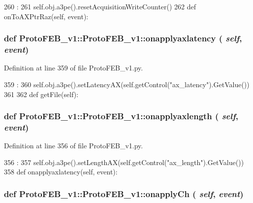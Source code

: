 \begin{DoxyCode}
260                                        :
261         self.obj.a3pe().resetAcquisitionWriteCounter()
262 
    def onToAXPtrRaz(self, event):
\end{DoxyCode}
\hypertarget{classProtoFEB__v1_1_1ProtoFEB__v1_ae3fb3c8b815e39c00a044325508913c8}{
\subsubsection[{onapplyaxlatency}]{\setlength{\rightskip}{0pt plus 5cm}def ProtoFEB\_\-v1::ProtoFEB\_\-v1::onapplyaxlatency ( {\em self}, \/   {\em event})}}
\label{classProtoFEB__v1_1_1ProtoFEB__v1_ae3fb3c8b815e39c00a044325508913c8}


Definition at line 359 of file ProtoFEB\_\-v1.py.


\begin{DoxyCode}
359                                      :
360         self.obj.a3pe().setLatencyAX(self.getControl("ax_latency").GetValue())
361 
362 
    def getFile(self):
\end{DoxyCode}
\hypertarget{classProtoFEB__v1_1_1ProtoFEB__v1_a2c116af8044e40e0b670a418ee7624c4}{
\subsubsection[{onapplyaxlength}]{\setlength{\rightskip}{0pt plus 5cm}def ProtoFEB\_\-v1::ProtoFEB\_\-v1::onapplyaxlength ( {\em self}, \/   {\em event})}}
\label{classProtoFEB__v1_1_1ProtoFEB__v1_a2c116af8044e40e0b670a418ee7624c4}


Definition at line 356 of file ProtoFEB\_\-v1.py.


\begin{DoxyCode}
356                                     :
357         self.obj.a3pe().setLengthAX(self.getControl("ax_length").GetValue())
358 
    def onapplyaxlatency(self, event):
\end{DoxyCode}
\hypertarget{classProtoFEB__v1_1_1ProtoFEB__v1_aad252d911e07f836c12e0cc011534862}{
\subsubsection[{onapplyCh}]{\setlength{\rightskip}{0pt plus 5cm}def ProtoFEB\_\-v1::ProtoFEB\_\-v1::onapplyCh ( {\em self}, \/   {\em event})}}
\label{classProtoFEB__v1_1_1ProtoFEB__v1_aad252d911e07f836c12e0cc011534862}


